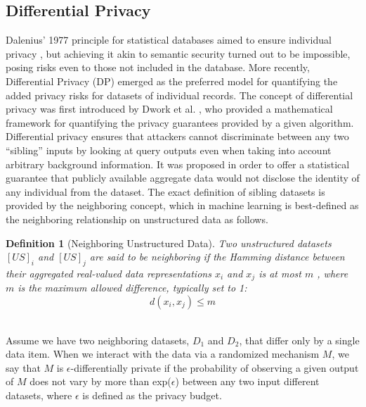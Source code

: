 \documentclass[11pt]{article}
\newtheorem{defn}{Definition}
\begin{document}
\subsection{Differential Privacy}

Dalenius' 1977 principle for statistical databases aimed to ensure individual privacy \cite{dalenius1977towards}, but achieving it akin to semantic security turned out to be impossible, posing risks even to those not included in the database. More recently, Differential Privacy (DP) emerged as the preferred model for quantifying the added privacy risks for datasets of individual records.
The concept of differential privacy was first introduced by Dwork et al. \cite{dworkDP}, who provided a mathematical framework for quantifying the privacy guarantees provided by a given algorithm. 
\\
    Differential privacy ensures that attackers cannot discriminate between any two ``sibling'' inputs by looking at query outputs even when taking into account arbitrary background information. It was proposed in order to offer a statistical guarantee that publicly available aggregate data would not disclose the identity of any individual from the dataset. The exact definition of sibling datasets is provided by the neighboring concept, which in machine learning is best-defined as the neighboring relationship on unstructured data as follows. %

\begin{defn}[Neighboring Unstructured Data]\label{def:neighboring}
    Two unstructured datasets $[US]_i$ and $[US]_j$ are said to be neighboring if the Hamming distance between their aggregated real-valued data representations $x_i$ and $x_j$ is at most $m$ \cite{DPSurvey}, where $m$ is the maximum allowed difference, typically set to 1:
    \[ d(x_i, x_j) \leq m \]
\end{defn}


\\
Assume we have two neighboring datasets, $D_1$ and $D_2$, that differ only by a single data item. When we interact with the data via a randomized mechanism $M$, we say that $M$ is $\epsilon$-differentially private if the probability of observing a given output of $M$ does not vary by more than exp($\epsilon$) between any two input different datasets, where $\epsilon$ is defined as the privacy budget. 
\end{document}
